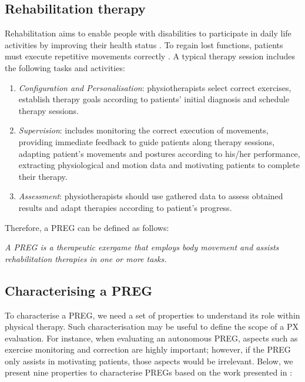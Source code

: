 \subsection{Rehabilitation therapy}
\label{sub:def_rehab_therapy}
Rehabilitation aims to enable people with disabilities to participate in daily life activities by improving their health status \autocite{Wiemeyer2015}. To regain lost functions, patients must execute repetitive movements correctly \autocite{PirovanoAdvisor2012}. A typical therapy session includes the following tasks and activities:
\begin{enumerate}
    \item \emph{Configuration and Personalisation}: physiotherapists select correct exercises, establish therapy goals according to patients' initial diagnosis and schedule therapy sessions.
    \item \emph{Supervision}: includes monitoring the correct execution of movements, providing immediate feedback to guide patients along therapy sessions, adapting patient's movements and postures according to his/her performance, extracting physiological and motion data and motivating patients to complete their therapy.
    \item \emph{Assessment}: physiotherapists should use gathered data to assess obtained results and adapt therapies according to patient's progress.
\end{enumerate}

Therefore, a \ac{PREG} can be defined as follows:

\emph{A \ac{PREG} is a therapeutic exergame that employs body movement and assists rehabilitation therapies in one or more tasks.}


\subsection{Characterising a \ac{PREG}} %
\label{sec:characterising}
To characterise a \ac{PREG}, we need a set of properties to understand its role within physical therapy. Such characterisation may be useful to define the scope of a \ac{PX} evaluation. For instance, when evaluating an autonomous \ac{PREG}, aspects such as exercise monitoring and correction are highly important; however, if the \ac{PREG} only assists in motivating patients, those aspects would be irrelevant. Below, we present nine properties to characterise \acp{PREG} based on the work presented in \autocite{PirovanoAdvisor2012}:

